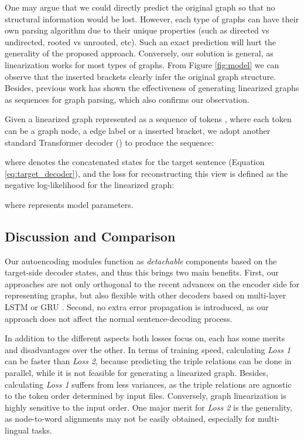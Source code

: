 \documentclass[11pt,a4paper]{article}
\begin{document}
One may argue that we could directly predict the original graph so that no structural information would be lost.
However, each type of graphs can have their own parsing algorithm due to their unique properties (such as directed vs undirected, rooted vs unrooted, etc).
Such an exact prediction will hurt the generality of the proposed approach.
Conversely, our solution is general, as linearization works for most types of graphs.
From Figure \ref{fig:model} we can observe that the inserted brackets clearly infer the original graph structure.
Besides, previous work \citep{iyer2017learning,konstas2017neural} has shown the effectiveness of generating linearized graphs as sequences for
graph parsing, which also confirms our observation.


Given a linearized graph represented as a sequence of tokens , 
where each token  can be a graph node, a edge label or a inserted bracket, 
we adopt another standard Transformer decoder () to produce the sequence:

where  denotes the concatenated states for the target sentence (Equation \ref{eq:target_decoder}), and the loss for reconstructing this view is defined as the negative log-likelihood for the linearized graph:

where  represents model parameters.


\subsection{Discussion and Comparison}


Our autoencoding modules function as \emph{detachable} components based on the target-side decoder states, and thus this brings two main benefits.
First, our approaches are not only orthogonal to the recent advances \citep{li2015gated,kipf2016semi,velivckovic2017graph} on the encoder side for representing graphs, but also flexible with other decoders based on multi-layer LSTM \citep{hochreiter1997long} or GRU \citep{cho2014learning}.
Second, no extra error propagation is introduced, as our approach does not affect the normal sentence-decoding process.


In addition to the different aspects both losses focus on, each has some merits and disadvantages over the other.
In terms of training speed, calculating \emph{Loss 1} can be faster than \emph{Loss 2}, because predicting the triple relations can be done in parallel, while it is not feasible for generating a linearized graph.
Besides, calculating \emph{Loss 1} suffers from less variances, as the triple relations are agnostic to the token order determined by input files.
Conversely, graph linearization is highly sensitive to the input order.
One major merit for \emph{Loss 2} is the generality, as node-to-word alignments may not be easily obtained, especially for multi-lingual tasks.
\end{document}
